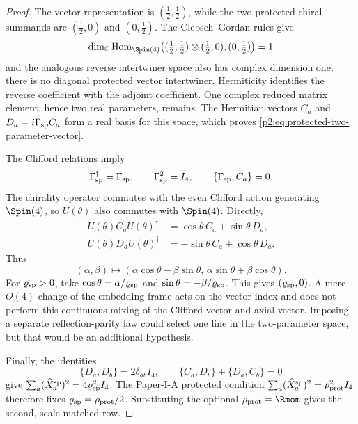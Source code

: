 \documentclass[12pt,a4paper]{article}
\begin{document}
\begin{proof}
The vector representation is
\((\tfrac12,\tfrac12)\), while the two protected chiral summands are
\((\tfrac12,0)\) and \((0,\tfrac12)\).  The Clebsch--Gordan rules give
\[
\dim_{\mathbb C}
\operatorname{Hom}_{\Spin(4)}
\!\left(
(\tfrac12,\tfrac12)\otimes(\tfrac12,0),(0,\tfrac12)
\right)=1
\]
and the analogous reverse intertwiner space also has complex dimension one;
there is no diagonal protected vector intertwiner.  Hermiticity identifies
the reverse coefficient with the adjoint coefficient.  One complex reduced
matrix element, hence two real parameters, remains.  The Hermitian vectors
\(C_a\) and \(D_a=i\Gamma_{\rm sp}C_a\) form a real basis for this space,
which proves \eqref{p2:eq:protected-two-parameter-vector}.

The Clifford relations imply
\[
\Gamma_{\rm sp}^\dagger=\Gamma_{\rm sp},
\qquad
\Gamma_{\rm sp}^2=I_4,
\qquad
\{\Gamma_{\rm sp},C_a\}=0.
\]
The chirality operator commutes with the even Clifford action generating
\(\Spin(4)\), so \(U(\theta)\) also commutes with \(\Spin(4)\).  Directly,
\begin{align*}
U(\theta)C_aU(\theta)^\dagger
&=\cos\theta\,C_a+\sin\theta\,D_a,\\
U(\theta)D_aU(\theta)^\dagger
&=-\sin\theta\,C_a+\cos\theta\,D_a.
\end{align*}
Thus
\[
(\alpha,\beta)\longmapsto
(\alpha\cos\theta-\beta\sin\theta,\,
 \alpha\sin\theta+\beta\cos\theta).
\]
For \(\varrho_{\rm sp}>0\), take
\(\cos\theta=\alpha/\varrho_{\rm sp}\) and
\(\sin\theta=-\beta/\varrho_{\rm sp}\).  This gives
\((\varrho_{\rm sp},0)\).
A mere \(O(4)\) change of the embedding frame acts on the vector index and
does not perform this continuous mixing of the Clifford vector and axial
vector.  Imposing a separate reflection-parity law could select one line in
the two-parameter space, but that would be an additional hypothesis.

Finally, the identities
\[
\{D_a,D_b\}=2\delta_{ab}I_4,
\qquad
\{C_a,D_b\}+\{D_a,C_b\}=0
\]
give
\(\sum_a(\widehat X_a^{\rm sp})^2=4\varrho_{\rm sp}^2I_4\).
The Paper-I-A protected condition
\(\sum_a(\widehat X_a^{\rm sp})^2=\rho_{\rm prot}^2I_4\) therefore fixes
\(\varrho_{\rm sp}=\rho_{\rm prot}/2\).  Substituting the optional
\(\rho_{\rm prot}=\Rmom\) gives the second, scale-matched row.
\end{proof}
\end{document}
